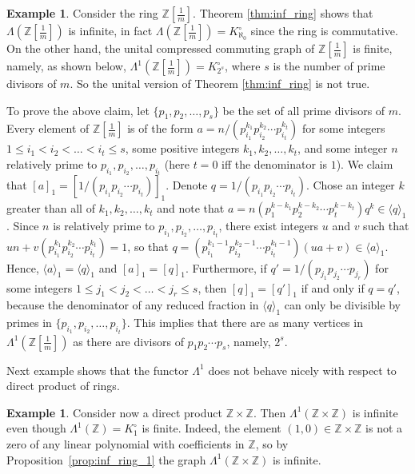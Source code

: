 \documentclass[12pt,a4paper]{amsart}
\theoremstyle{definition}
\newtheorem{example}[proposition]{Example}
\newcommand{\Z}{\mathbb{Z}}
\newcommand{\rng}[1]{\langle #1 \rangle}
\begin{document}
\begin{example} \label{ex:Z1/m}
 Consider the ring $\Z[\frac{1}{m}]$. Theorem \ref{thm:inf_ring} shows that $\Lambda(\Z[\frac{1}{m}])$ is infinite, in fact $\Lambda(\Z[\frac{1}{m}]) = K^{\circ}_{\aleph_0}$ since the ring is commutative.
 On the other hand, the unital compressed commuting graph of $\Z[\frac{1}{m}]$ is finite, namely, as shown below, $\Lambda^1(\Z[\frac{1}{m}]) = K^{\circ}_{2^s}$, where $s$ is the number of prime divisors of $m$. So the unital version of  Theorem \ref{thm:inf_ring} is not true.

 To prove the above claim, let $\{p_1,p_2,\ldots,p_s\}$ be the set of all prime divisors of $m$.
 Every element of $\Z[\frac1m]$ is of the form $a=n/(p_{i_1}^{k_1}p_{i_2}^{k_2}\cdots p_{i_t}^{k_t})$ for some integers $1 \le i_1 <i_2<\ldots<i_t \le s$, some positive integers $k_1,k_2,\ldots,k_t$, and some integer $n$ relatively prime to $p_{i_1}, p_{i_2},\ldots, p_{i_t}$ (here $t=0$ iff the denominator is $1$).
 We claim that $[a]_1=[1/(p_{i_1}p_{i_2}\cdots p_{i_t})]_1$. Denote $q=1/(p_{i_1}p_{i_2}\cdots p_{i_t})$.
 Chose an integer $k$ greater than all of $k_1,k_2,\ldots,k_t$ and note that $a=n(p_1^{k-k_1}p_2^{k-k_2}\cdots p_t^{k-k_t})q^k \in \rng{q}_1$. 
 Since $n$ is relatively prime to $p_{i_1}, p_{i_2},\ldots, p_{i_t}$, there exist integers $u$ and $v$ such that $un+v(p_{i_1}^{k_1}p_{i_2}^{k_2}\cdots p_{i_t}^{k_t})=1$, so that $q=(p_{i_1}^{k_1-1}p_{i_2}^{k_2-1}\cdots p_{i_t}^{k_t-1})(ua+v) \in \rng{a}_1$.
 Hence, $\rng{a}_1=\rng{q}_1$ and $[a]_1=[q]_1$.
 Furthermore, if $q' = 1/(p_{j_1}p_{j_2}\cdots p_{j_{r}})$ for some integers $1 \le j_1 <j_2<\ldots<j_{r} \le s$, then $[q]_1=[q']_1$ if and only if $q=q'$, because the denominator of any reduced fraction in $\rng{q}_1$ can only be divisible by primes in $\{p_{i_1}, p_{i_2},\ldots, p_{i_t}\}$.
 This implies that there are as many vertices in $\Lambda^1(\Z[\frac 1m])$ as there are divisors of $p_1p_2\cdots p_s$, namely, $2^s$.
 \end{example}

Next example shows that the functor $\Lambda^1$ does not behave nicely with respect to direct product of rings. 
 
 \begin{example}
 Consider now a direct product $\Z \times \Z$. Then $\Lambda^1(\Z \times \Z)$ is infinite even though $\Lambda^1(\Z) = K^{\circ}_1$ is finite. 
 Indeed, the element $(1,0) \in \Z \times \Z$ is not a zero of any linear polynomial with coefficients in $\Z$, so by Proposition~\ref{prop:inf_ring_1} the graph $\Lambda^1(\Z \times \Z)$ is infinite. 
\end{example}
\end{document}
